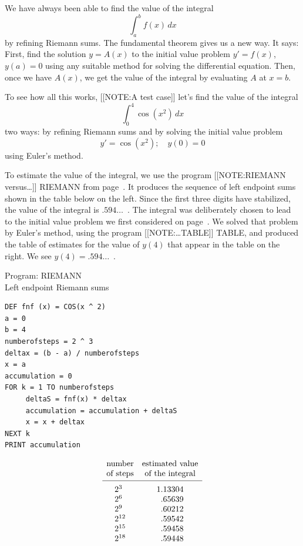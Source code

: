 	We have always been able to find the value of the integral
	\[
\int_a^b f(x) \, dx
\]
by refining Riemann sums.  The fundamental theorem gives us a new way.  It says: First, find the solution $y = A(x)$ to the initial value problem $y' = f(x)$, $y(a) = 0$ using any suitable method for solving the differential equation.  Then, once we have $A(x)$, we get the value of the integral by evaluating $A$ at $x = b$.

\pagebreak

	To see how all this works, 
	[[NOTE:A test case]]
let's find the value of the integral
	\[
\int_0^4 \cos(x^2) \, dx
\]
two ways: by refining Riemann sums and by solving the initial value problem
	\[
y' = \cos(x^2); \quad y(0) = 0
\]
using Euler's method.  

To estimate the value of the integral, we use the program 
[[NOTE:RIEMANN versus\ldots]]
RIEMANN from page~\pageref{program RIEMANN}.  It
produces the sequence of left endpoint sums shown in the table below
on the left.  Since the first three digits have stabilized, the value
of the integral is $.594\ldots$~.  The integral was deliberately
chosen to lead to the initial value problem we first considered on
page~\pageref{accum delta y}.  We solved that problem by Euler's
method, using the program
[[NOTE:\ldots TABLE]]
TABLE, and produced the table of estimates for the value
of $y(4)$ that appear in the table on the right.  We see $y(4) =
.594\ldots$~.



\footnotesize
\hspace{-99pt}
\begin{center}
Program: RIEMANN\\
Left endpoint Riemann sums
\end{center}


\begin{verbatim}
DEF fnf (x) = COS(x ^ 2)
a = 0
b = 4
numberofsteps = 2 ^ 3
deltax = (b - a) / numberofsteps
x = a
accumulation = 0
FOR k = 1 TO numberofsteps
     deltaS = fnf(x) * deltax
     accumulation = accumulation + deltaS
     x = x + deltax
NEXT k
PRINT accumulation
\end{verbatim}
	\[
\begin{array}{cc}
	\mbox{number} & \mbox{estimated value} \\
	\mbox{of steps} & \mbox{of the integral}  	\\ [2pt]
	\hline \\ [-7pt]
	\begin{array}{l} 
		2^3 \\ 2^6 \\ 2^9 \\ 2^{12} \\ 2^{15} \\ 2^{18}
	\end{array}
	&
	\begin{array}{r}
		1.13304 \\ .65639 \\ .60212 \\ .59542 \\ .59458 \\
			.59448
	\end{array}
\end{array}
\]

